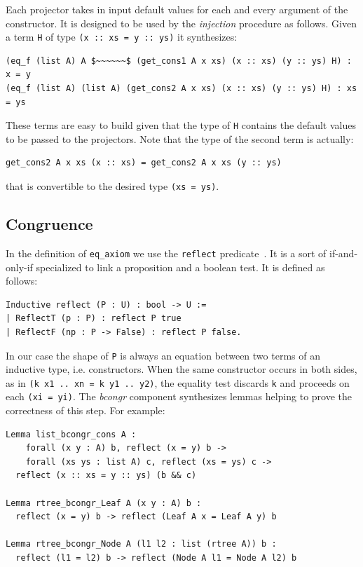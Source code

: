\documentclass[a4paper,UKenglish,cleveref, autoref]{lipics-v2019}
\newcommand{\derive}[1]{\emph{#1}}
\begin{document}
\noindent
Each projector takes in input default values for each and every
argument of the constructor. It is designed to be used by the
\derive{injection} procedure as follows. Given a term
\lstinline+H+ of type \lstinline+(x :: xs = y :: ys)+
it synthesizes:
\begin{lstlisting}
(eq_f (list A) A $~~~~~~$ (get_cons1 A x xs) (x :: xs) (y :: ys) H) : x = y
(eq_f (list A) (list A) (get_cons2 A x xs) (x :: xs) (y :: ys) H) : xs = ys
\end{lstlisting}

\noindent
These terms are easy to build given that the type of \lstinline+H+
contains the default values to be passed to the projectors.
Note that the type of the second term is actually:
\begin{lstlisting}
get_cons2 A x xs (x :: xs) = get_cons2 A x xs (y :: ys)
\end{lstlisting}

\noindent
that is convertible to the desired type \lstinline+(xs = ys)+.

\subsection{Congruence} %
\label{sec:reflect}

In the definition of \lstinline+eq_axiom+ we use the \lstinline+reflect+
predicate~\cite{mcb}. It is a sort of if-and-only-if specialized to link a
proposition and a boolean test. It is defined as follows:
\begin{lstlisting}
Inductive reflect (P : U) : bool -> U :=
| ReflectT (p : P) : reflect P true
| ReflectF (np : P -> False) : reflect P false.
\end{lstlisting}

\noindent
In our case the shape of
\lstinline+P+ is always an equation between two terms of
an inductive type, i.e. constructors.
When the same constructor occurs in both sides, as in
\lstinline+(k x1 .. xn = k y1 .. y2)+, the equality test
discards \lstinline+k+ and proceeds on each \lstinline+(xi = yi)+.
The \derive{bcongr} component synthesizes lemmas
helping to prove the correctness of this step. For example:
\begin{lstlisting}
Lemma list_bcongr_cons A :
    forall (x y : A) b, reflect (x = y) b ->
    forall (xs ys : list A) c, reflect (xs = ys) c ->
  reflect (x :: xs = y :: ys) (b && c)

Lemma rtree_bcongr_Leaf A (x y : A) b :
  reflect (x = y) b -> reflect (Leaf A x = Leaf A y) b

Lemma rtree_bcongr_Node A (l1 l2 : list (rtree A)) b :
  reflect (l1 = l2) b -> reflect (Node A l1 = Node A l2) b
\end{lstlisting}
\end{document}
